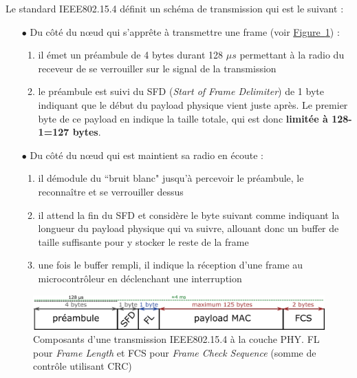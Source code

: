 \documentclass[]{report}
\newcommand{\wordlink}[2]{\hyperref[#2]{#1~\ref{#2}}}
\begin{document}
\par Le standard IEEE802.15.4 définit un schéma de transmission qui est le suivant \cite{stack-IoT} \cite{app-sec-openWSN} :
\vspace{0.2cm}
\begin{itemize}
\item[$\bullet$] Du côté du nœud qui s'apprête à transmettre une frame (voir \wordlink{Figure}{fig:IEEE802.15.4-PHY}) :
	\begin{enumerate}
	\item il émet un préambule de 4 bytes durant 128 $\mu s$ permettant à la radio du receveur de se verrouiller sur le signal de la transmission
	\item le préambule est suivi du SFD (\textit{Start of Frame Delimiter}) de 1 byte indiquant que le début du payload physique vient juste après. Le premier byte de ce payload en indique la taille totale, qui est donc \textbf{limitée à 128-1=127 bytes}.
	\end{enumerate}

\vspace{0.2cm}

\item[$\bullet$] Du côté du nœud qui est maintient sa radio en écoute :
	\begin{enumerate}
	\item il démodule du ``bruit blanc" jusqu'à percevoir le préambule, le reconnaître et se verrouiller dessus
	\item il attend la fin du SFD et considère le byte suivant comme indiquant la longueur du payload physique qui va suivre, allouant donc un buffer de taille suffisante pour y stocker le reste de la frame
	\item une fois le buffer rempli, il indique la réception d'une frame au microcontrôleur en déclenchant une interruption
	\end{enumerate}

\end{itemize}

\vspace{0.8cm}

	\begin{figure}[!ht]
	\centering
	\includegraphics[width=0.9\linewidth]{IEEE802_15_4-PHY}
	\caption{Composants d'une transmission IEEE802.15.4 à la couche PHY. FL pour \textit{Frame Length} et FCS pour \textit{Frame Check Sequence} (somme de contrôle utilisant CRC)}
	\label{fig:IEEE802.15.4-PHY}
	\end{figure}
	
\end{document}
